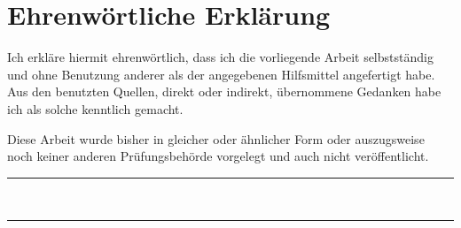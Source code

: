 \section*{Ehrenwörtliche Erklärung}

Ich erkläre hiermit ehrenwörtlich, dass ich die vorliegende Arbeit selbstständig und ohne Benutzung anderer als der angegebenen Hilfsmittel angefertigt habe. Aus den benutzten Quellen, direkt oder indirekt, übernommene Gedanken habe ich als solche kenntlich gemacht.

Diese Arbeit wurde bisher in gleicher oder ähnlicher Form oder auszugsweise noch keiner anderen Prüfungsbehörde vorgelegt und auch nicht veröffentlicht.

\vspace{1cm}

\parbox{4cm}{%
    \rule{4cm}{1pt}\\
}\hfill
\parbox{5cm}{%
    \rule{5cm}{1pt}\\
}